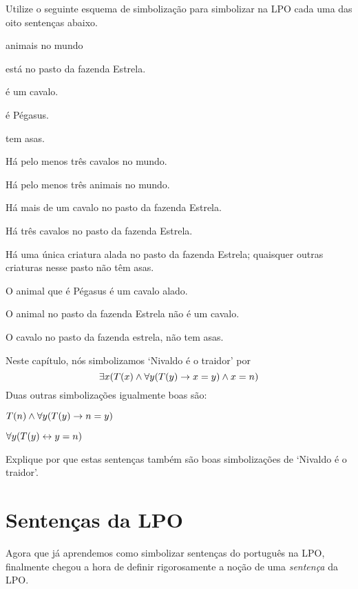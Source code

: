 \problempart Utilize o seguinte esquema de simbolização para simbolizar na LPO cada uma das oito sentenças abaixo.
\begin{center}
\begin{ekey}
\item[\text{domínio}] animais no mundo
\item[\atom{E}{x}]  está no pasto da fazenda Estrela.
\item[\atom{C}{x}]  é um cavalo.
\item[\atom{P}{x}]  é Pégasus.
\item[\atom{A}{x}]  tem asas.
\end{ekey}
\end{center}
\begin{earg}
\item Há pelo menos três cavalos no mundo.
\item Há pelo menos três animais no mundo.
\item Há mais de um cavalo no pasto da fazenda Estrela.
\item Há três cavalos no pasto da fazenda Estrela.
\item Há uma única criatura alada no pasto da fazenda Estrela; quaisquer outras criaturas nesse pasto não têm asas.
\item O animal que é Pégasus é um cavalo alado.
\item O animal no pasto da fazenda Estrela não é um cavalo.
\item O cavalo no pasto da fazenda estrela, não tem asas.
\end{earg}

\problempart
Neste capítulo, nós simbolizamos `Nivaldo é o traidor' por
$$\exists x (\mathord{T}(x) \wedge \forall y(\mathord{T}(y) \rightarrow x = y) \wedge x = n)$$
Duas outras simbolizações igualmente boas são:
	\begin{ebullet}
		\item $\mathord{T}(n) \wedge \forall y(\mathord{T}(y) \rightarrow n = y)$
		\item $\forall y(\mathord{T}(y) \leftrightarrow y = n)$
	\end{ebullet}
Explique por que estas sentenças também são boas simbolizações de `Nivaldo é o traidor'.


\chapter{Sentenças da LPO}\label{s:FOLSentences}
Agora que já aprendemos como simbolizar sentenças do português na LPO, finalmente  chegou a hora de definir rigorosamente a noção de uma \emph{sentença} da LPO.

